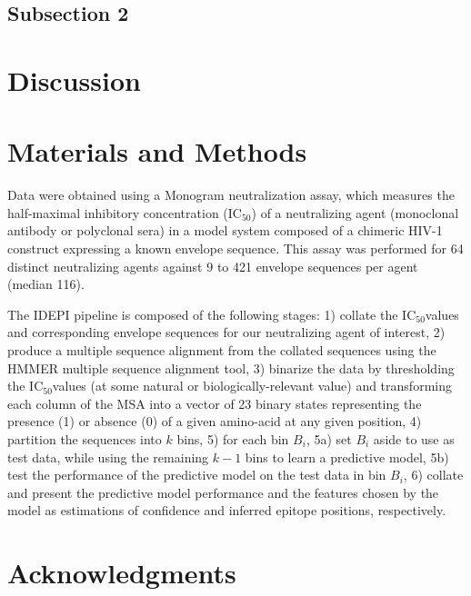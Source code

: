 \documentclass[10pt]{article}
\newcommand{\HMIC}{{IC}$_{50}$}
\begin{document}
\subsection*{Subsection 2}

\section*{Discussion}

\section*{Materials and Methods}
Data were obtained using a Monogram neutralization assay,
which measures the half-maximal inhibitory concentration (\HMIC)
of a neutralizing agent (monoclonal antibody or polyclonal sera) in a model system composed of a chimeric HIV-1 construct expressing a known envelope sequence.
This assay was performed for 64 distinct neutralizing agents against 9 to 421 envelope sequences per agent (median 116).

The IDEPI pipeline is composed of the following stages:
1) collate the \HMIC values and corresponding envelope sequences for our neutralizing agent of interest,
2) produce a multiple sequence alignment from the collated sequences using the {HMMER} multiple sequence alignment tool,
3) binarize the data by thresholding the \HMIC values (at some natural or biologically-relevant value)
and transforming each column of the MSA into a vector of 23 binary states representing the presence (1) or absence (0) of a given amino-acid at any given position,
4) partition the sequences into $k$ bins,
5) for each bin $B_i$,
5a) set $B_i$ aside to use as test data,
while using the remaining $k-1$ bins to learn a predictive model,
5b) test the performance of the predictive model on the test data in bin $B_i$,
6) collate and present the predictive model performance and the features chosen by the model as estimations of confidence and inferred epitope positions, respectively.

\section*{Acknowledgments}



\end{document}

